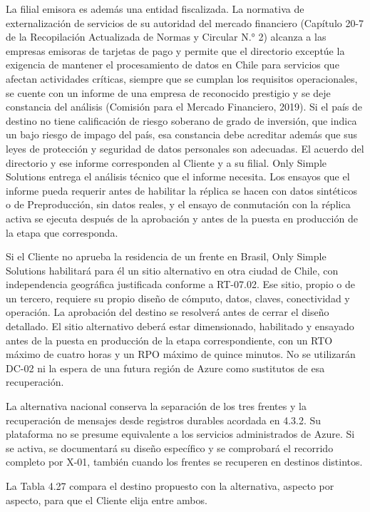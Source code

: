 \documentclass[11pt]{article}
\begin{document}
La filial emisora es además una entidad fiscalizada. La normativa de externalización de servicios de su autoridad del mercado financiero (Capítulo 20-7 de la Recopilación Actualizada de Normas y Circular N.° 2) alcanza a las empresas emisoras de tarjetas de pago y permite que el directorio exceptúe la exigencia de mantener el procesamiento de datos en Chile para servicios que afectan actividades críticas, siempre que se cumplan los requisitos operacionales, se cuente con un informe de una empresa de reconocido prestigio y se deje constancia del análisis (Comisión para el Mercado Financiero, 2019). Si el país de destino no tiene calificación de riesgo soberano de grado de inversión, que indica un bajo riesgo de impago del país, esa constancia debe acreditar además que sus leyes de protección y seguridad de datos personales son adecuadas. El acuerdo del directorio y ese informe corresponden al Cliente y a su filial. Only Simple Solutions entrega el análisis técnico que el informe necesita. Los ensayos que el informe pueda requerir antes de habilitar la réplica se hacen con datos sintéticos o de Preproducción, sin datos reales, y el ensayo de conmutación con la réplica activa se ejecuta después de la aprobación y antes de la puesta en producción de la etapa que corresponda.

Si el Cliente no aprueba la residencia de un frente en Brasil, Only Simple Solutions habilitará para él un sitio alternativo en otra ciudad de Chile, con independencia geográfica justificada conforme a RT-07.02. Ese sitio, propio o de un tercero, requiere su propio diseño de cómputo, datos, claves, conectividad y operación. La aprobación del destino se resolverá antes de cerrar el diseño detallado. El sitio alternativo deberá estar dimensionado, habilitado y ensayado antes de la puesta en producción de la etapa correspondiente, con un RTO máximo de cuatro horas y un RPO máximo de quince minutos. No se utilizarán DC-02 ni la espera de una futura región de Azure como sustitutos de esa recuperación.

La alternativa nacional conserva la separación de los tres frentes y la recuperación de mensajes desde registros durables acordada en 4.3.2. Su plataforma no se presume equivalente a los servicios administrados de Azure. Si se activa, se documentará su diseño específico y se comprobará el recorrido completo por X-01, también cuando los frentes se recuperen en destinos distintos.


La Tabla 4.27 compara el destino propuesto con la alternativa, aspecto por aspecto, para que el Cliente elija entre ambos.
\end{document}
